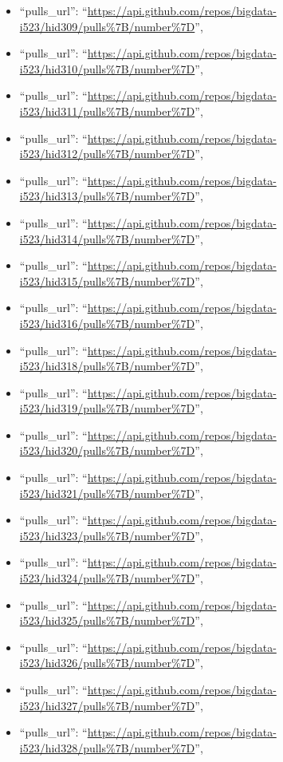\begin{itemize}
\item
  ``pulls\_url'':
  ``\url{https://api.github.com/repos/bigdata-i523/hid309/pulls\%7B/number\%7D}'',
\item
  ``pulls\_url'':
  ``\url{https://api.github.com/repos/bigdata-i523/hid310/pulls\%7B/number\%7D}'',
\item
  ``pulls\_url'':
  ``\url{https://api.github.com/repos/bigdata-i523/hid311/pulls\%7B/number\%7D}'',
\item
  ``pulls\_url'':
  ``\url{https://api.github.com/repos/bigdata-i523/hid312/pulls\%7B/number\%7D}'',
\item
  ``pulls\_url'':
  ``\url{https://api.github.com/repos/bigdata-i523/hid313/pulls\%7B/number\%7D}'',
\item
  ``pulls\_url'':
  ``\url{https://api.github.com/repos/bigdata-i523/hid314/pulls\%7B/number\%7D}'',
\item
  ``pulls\_url'':
  ``\url{https://api.github.com/repos/bigdata-i523/hid315/pulls\%7B/number\%7D}'',
\item
  ``pulls\_url'':
  ``\url{https://api.github.com/repos/bigdata-i523/hid316/pulls\%7B/number\%7D}'',
\item
  ``pulls\_url'':
  ``\url{https://api.github.com/repos/bigdata-i523/hid318/pulls\%7B/number\%7D}'',
\item
  ``pulls\_url'':
  ``\url{https://api.github.com/repos/bigdata-i523/hid319/pulls\%7B/number\%7D}'',
\item
  ``pulls\_url'':
  ``\url{https://api.github.com/repos/bigdata-i523/hid320/pulls\%7B/number\%7D}'',
\item
  ``pulls\_url'':
  ``\url{https://api.github.com/repos/bigdata-i523/hid321/pulls\%7B/number\%7D}'',
\item
  ``pulls\_url'':
  ``\url{https://api.github.com/repos/bigdata-i523/hid323/pulls\%7B/number\%7D}'',
\item
  ``pulls\_url'':
  ``\url{https://api.github.com/repos/bigdata-i523/hid324/pulls\%7B/number\%7D}'',
\item
  ``pulls\_url'':
  ``\url{https://api.github.com/repos/bigdata-i523/hid325/pulls\%7B/number\%7D}'',
\item
  ``pulls\_url'':
  ``\url{https://api.github.com/repos/bigdata-i523/hid326/pulls\%7B/number\%7D}'',
\item
  ``pulls\_url'':
  ``\url{https://api.github.com/repos/bigdata-i523/hid327/pulls\%7B/number\%7D}'',
\item
  ``pulls\_url'':
  ``\url{https://api.github.com/repos/bigdata-i523/hid328/pulls\%7B/number\%7D}'',

\end{itemize}
